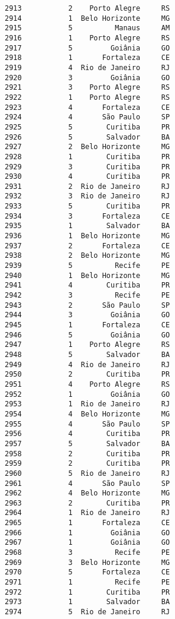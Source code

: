 \documentclass[11pt]{article}
\begin{document}
\begin{Verbatim}[commandchars=\\\{\}]
2913           2    Porto Alegre     RS  
2914           1  Belo Horizonte     MG  
2915           5          Manaus     AM  
2916           1    Porto Alegre     RS  
2917           5         Goiânia     GO  
2918           1       Fortaleza     CE  
2919           4  Rio de Janeiro     RJ  
2920           3         Goiânia     GO  
2921           3    Porto Alegre     RS  
2922           1    Porto Alegre     RS  
2923           4       Fortaleza     CE  
2924           4       São Paulo     SP  
2925           5        Curitiba     PR  
2926           5        Salvador     BA  
2927           2  Belo Horizonte     MG  
2928           1        Curitiba     PR  
2929           3        Curitiba     PR  
2930           4        Curitiba     PR  
2931           2  Rio de Janeiro     RJ  
2932           3  Rio de Janeiro     RJ  
2933           5        Curitiba     PR  
2934           3       Fortaleza     CE  
2935           1        Salvador     BA  
2936           1  Belo Horizonte     MG  
2937           2       Fortaleza     CE  
2938           2  Belo Horizonte     MG  
2939           5          Recife     PE  
2940           1  Belo Horizonte     MG  
2941           4        Curitiba     PR  
2942           3          Recife     PE  
2943           2       São Paulo     SP  
2944           3         Goiânia     GO  
2945           1       Fortaleza     CE  
2946           5         Goiânia     GO  
2947           1    Porto Alegre     RS  
2948           5        Salvador     BA  
2949           4  Rio de Janeiro     RJ  
2950           2        Curitiba     PR  
2951           4    Porto Alegre     RS  
2952           1         Goiânia     GO  
2953           1  Rio de Janeiro     RJ  
2954           4  Belo Horizonte     MG  
2955           4       São Paulo     SP  
2956           4        Curitiba     PR  
2957           5        Salvador     BA  
2958           2        Curitiba     PR  
2959           2        Curitiba     PR  
2960           5  Rio de Janeiro     RJ  
2961           4       São Paulo     SP  
2962           4  Belo Horizonte     MG  
2963           2        Curitiba     PR  
2964           1  Rio de Janeiro     RJ  
2965           1       Fortaleza     CE  
2966           1         Goiânia     GO  
2967           1         Goiânia     GO  
2968           3          Recife     PE  
2969           3  Belo Horizonte     MG  
2970           5       Fortaleza     CE  
2971           1          Recife     PE  
2972           1        Curitiba     PR  
2973           1        Salvador     BA  
2974           5  Rio de Janeiro     RJ  

\end{Verbatim}
\end{document}

